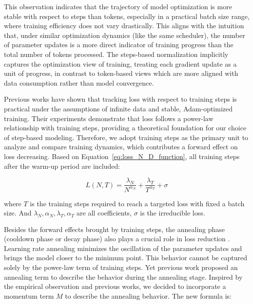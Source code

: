 \documentclass[letterpaper]{article} %
\begin{document}
This observation indicates that the trajectory of model optimization is more stable with respect to steps than tokens, especially in a practical batch size range, where training efficiency does not vary drastically. This aligns with the intuition that, under similar optimization dynamics (like the same scheduler), the number of parameter updates is a more direct indicator of training progress than the total number of tokens processed. The steps-based normalization implicitly captures the optimization view of training, treating each gradient update as a unit of progress, in contrast to token-based views which are more aligned with data consumption rather than model convergence.

Previous works \cite{Kaplan2020ScalingLF, Fedus2021SwitchTS} have shown that tracking loss with respect to training steps is practical under the assumptions of infinite data and stable, Adam-optimized training. Their experiments demonstrate that loss follows a power-law relationship with training steps, providing a theoretical foundation for our choice of step-based modeling. Therefore, we adopt training steps as the primary unit to analyze and compare training dynamics, which contributes a forward effect on loss decreasing. Based on Equation~\ref{eq:loss_N_D_function}, all training steps after the warm-up period are included:

\begin{equation}
    L(N, T) = \frac{\lambda_N}{N^{\alpha_N}} + \frac{\lambda_{T}}{{T}^{\alpha_T}} + \sigma
\label{eq:L_T_N_function}
\end{equation}


\noindent where $T$ is the training steps required to reach a targeted loss with fixed a batch size. And $\lambda_N, \alpha_{N}, \lambda_T, \alpha_T$ are all coefficients, $\sigma$ is the irreducible loss.

Besides the forward effects brought by training steps, the annealing phase (cooldown phase or decay phase) also plays a crucial role in loss reduction \cite{hagele2024scaling, Granziol2020LearningRA}. Learning rate annealing minimizes the oscillation of the parameter updates and brings the model closer to the minimum point. This behavior cannot be captured solely by the power-law term of training steps. Yet previous work \cite{tissue2024scaling} proposed an annealing term to describe the behavior during the annealing stage. Inspired by the empirical observation and previous works, we decided to incorporate a momentum term $M$ to describe the annealing behavior. The new formula is:
\end{document}
